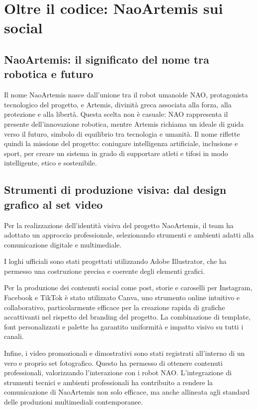\documentclass{optica-article}
\begin{document}
\bigskip
\section{Oltre il codice: NaoArtemis sui social}

\subsection{NaoArtemis: il significato del nome tra robotica e futuro}
Il nome NaoArtemis nasce dall’unione tra il robot umanoide NAO, protagonista tecnologico del progetto, e Artemis, divinit\`a greca associata alla forza, alla protezione e alla libert\`a. Questa scelta non \`e casuale: NAO rappresenta il presente dell’innovazione robotica, mentre Artemis richiama un ideale di guida  verso il futuro, simbolo di equilibrio tra tecnologia e umanit\`a. Il nome riflette quindi la missione del progetto: coniugare intelligenza artificiale, inclusione e sport, per creare un sistema in grado di supportare atleti e tifosi in modo intelligente, etico e sostenibile.

\subsection{Strumenti di produzione visiva: dal design grafico al set video}
Per la realizzazione dell’identit\`a visiva del progetto NaoArtemis, il team ha adottato un approccio professionale, selezionando strumenti e ambienti adatti alla comunicazione digitale e multimediale.

I loghi ufficiali sono stati progettati utilizzando Adobe Illustrator, che ha permesso una costruzione precisa e coerente degli elementi grafici. 

Per la produzione dei contenuti social \textemdash{} come post, storie e caroselli per Instagram, Facebook e TikTok \textemdash{} \`e stato utilizzato Canva, uno strumento online intuitivo e collaborativo, particolarmente efficace per la creazione rapida di grafiche accattivanti nel rispetto del branding del progetto. La combinazione di template, font personalizzati e palette ha garantito uniformit\`a e impatto visivo su tutti i canali.

Infine, i video promozionali e dimostrativi sono stati registrati all’interno di un vero e proprio set fotografico. Questo ha permesso di ottenere contenuti professionali, valorizzando l’interazione con i robot NAO.
L’integrazione di strumenti tecnici e ambienti professionali ha contribuito a rendere la comunicazione di NaoArtemis non solo efficace, ma anche allineata agli standard delle produzioni multimediali contemporanee.
\end{document}
